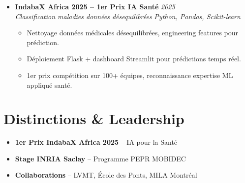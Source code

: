 \documentclass[a4paper,11pt]{article}
\begin{document}
\begin{itemize}[leftmargin=0.5cm, nosep]
    \item \textbf{IndabaX Africa 2025 -- 1er Prix IA Sant\'e} \hfill \textit{2025} \\
    \textit{Classification maladies donn\'ees d\'esequilibr\'ees} \hfill \textit{Python, Pandas, Scikit-learn}
    \vspace{-2pt}
    \begin{itemize}[leftmargin=0.4cm, nosep, label=\tiny$\bullet$]
        \item \small{Nettoyage donn\'ees m\'edicales d\'esequilibr\'ees, engineering features pour pr\'ediction.}
        \item \small{D\'eploiement Flask + dashboard Streamlit pour pr\'edictions temps r\'eel.}
        \item \small{1er prix comp\'etition sur 100+ \'equipes, reconnaissance expertise ML appliqu\'e sant\'e.}
    \end{itemize}
\end{itemize}

\section{Distinctions \& Leadership}
\begin{itemize}[leftmargin=0.5cm, nosep]
    \item \textbf{1er Prix IndabaX Africa 2025} -- IA pour la Sant\'e
    \item \textbf{Stage INRIA Saclay} -- Programme PEPR MOBIDEC
    \item \textbf{Collaborations} -- LVMT, \'Ecole des Ponts, MILA Montr\'eal
\end{itemize}
\end{document}
